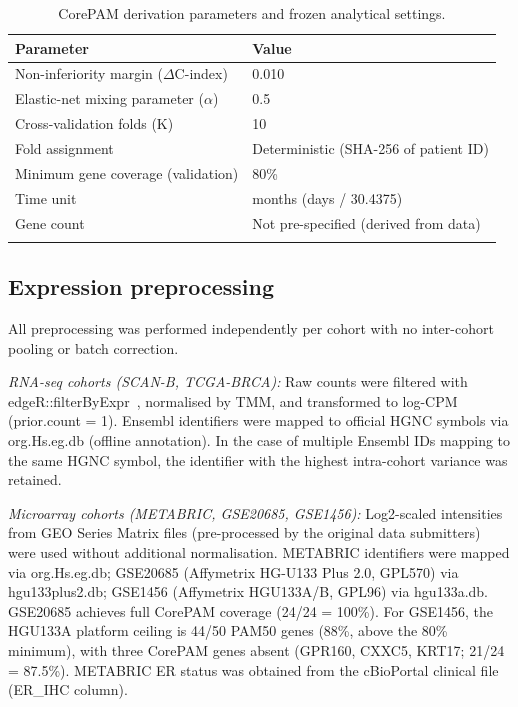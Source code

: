 \documentclass[pdflatex,sn-vancouver-num]{sn-jnl}
\begin{document}
\begin{table}[!ht]
\caption{CorePAM derivation parameters and frozen analytical settings.}\label{tab:freeze}
\begin{tabular}{@{}ll@{}}
\toprule
Parameter & Value \\
\midrule
Non-inferiority margin ($\Delta$C-index) & 0.010 \\
Elastic-net mixing parameter ($\alpha$) & 0.5 \\
Cross-validation folds (K) & 10 \\
Fold assignment & Deterministic (SHA-256 of patient ID) \\
Minimum gene coverage (validation) & 80\% \\
Time unit & months (days / 30.4375) \\
Gene count & Not pre-specified (derived from data) \\
\botrule
\end{tabular}
\end{table}

\subsection{Expression preprocessing}\label{subsec:expression-preprocessing}

All preprocessing was performed independently per cohort with no inter-cohort pooling or batch correction.

\textit{RNA-seq cohorts (SCAN-B, TCGA-BRCA):} Raw counts were filtered with edgeR::filterByExpr~\cite{robinson2010}, normalised by TMM, and transformed to log-CPM (prior.count = 1). Ensembl identifiers were mapped to official HGNC symbols via org.Hs.eg.db (offline annotation). In the case of multiple Ensembl IDs mapping to the same HGNC symbol, the identifier with the highest intra-cohort variance was retained.

\textit{Microarray cohorts (METABRIC, GSE20685, GSE1456):} Log2-scaled intensities from GEO Series Matrix files (pre-processed by the original data submitters) were used without additional normalisation. METABRIC identifiers were mapped via org.Hs.eg.db; GSE20685 (Affymetrix HG-U133 Plus 2.0, GPL570) via hgu133plus2.db; GSE1456 (Affymetrix HGU133A/B, GPL96) via hgu133a.db. GSE20685 achieves full CorePAM coverage (24/24 = 100\%). For GSE1456, the HGU133A platform ceiling is 44/50 PAM50 genes (88\%, above the 80\% minimum), with three CorePAM genes absent (GPR160, CXXC5, KRT17; 21/24 = 87.5\%). METABRIC ER status was obtained from the cBioPortal clinical file (ER\_IHC column).
\end{document}
